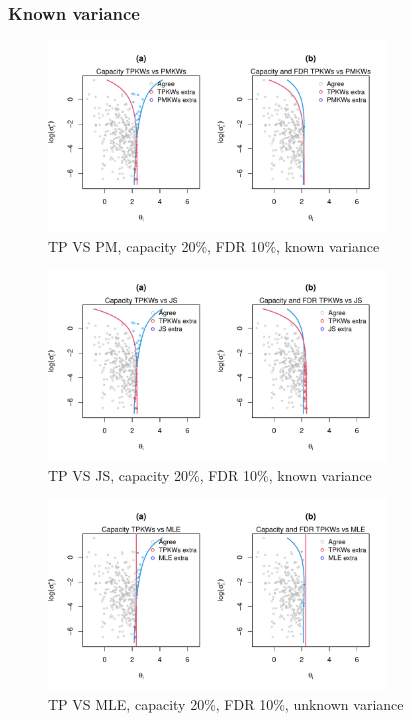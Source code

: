 \documentclass[12pt]{article}
\begin{document}
\newpage
\subsubsection{Known variance}
\label{section:known}
\begin{figure}[h!]
    \centering
    \includegraphics[width=0.8\textwidth]{../../Figures/2013-2022/GMM_fd/GLmix/Contour_Left_0.2_0.1_TPKWs_PMKWs.pdf}
    \caption{TP VS PM,  capacity 20\%, FDR 10\%, known variance}
\end{figure}

\begin{figure}[h!]
    \centering
    \includegraphics[width=0.8\textwidth]{../../Figures/2013-2022/GMM_fd/GLmix/Contour_Left_0.2_0.1_TPKWs_JS.pdf}
    \caption{TP VS JS, capacity 20\%, FDR 10\%, known variance}
\end{figure}

\begin{figure}[h!]
    \centering
    \includegraphics[width=0.8\textwidth]{../../Figures/2013-2022/GMM_fd/GLmix/Contour_Left_0.2_0.1_TPKWs_MLE.pdf}
    \caption{TP VS MLE, capacity 20\%, FDR 10\%, unknown variance}
\end{figure}
\end{document}
